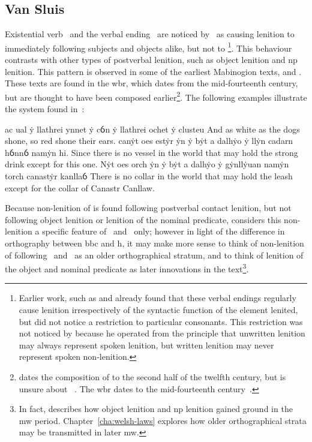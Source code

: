 \subsection{Van Sluis}
\label{sec:van-sluis}
Existential verb \oes\ and the verbal ending \ei\ are noticed by~\textcite{van_development14} as causing lenition to immediately following subjects and objects alike, but not to \footnote{Earlier work, such as \textcite[§~21]{evans_grammar_1964} and \textcite[§~70]{morgan_y_1952} already found that these verbal endings regularly cause lenition irrespectively of the syntactic function of the element lenited, but did not notice a restriction to particular consonants. This restriction was not noticed by \textcite[§~71]{morgan_y_1952} because he operated from the principle that unwritten lenition may always represent spoken lenition, but written lenition may never represent spoken non-lenition.}. This behaviour contrasts with other types of postverbal lenition, such as object lenition and \gls{np} lenition. This pattern is observed in some of the earliest Mabinogion texts, \ie {} and . These texts are found in the \gls{wbr}, which dates from the mid-fourteenth century, but are thought to have been composed earlier\footnote{\Textcite[43]{rodway_date_2005} dates the composition of  to the second half of the twelfth century, but is unsure about ~\autocite[59]{Rod_Where07}. The \gls{wbr} dates to the mid-fourteenth century~\autocite[59]{huws_medieval_2000}.}. The following examples  illustrate the system found in~\textcite{van_development14}:
\begin{mwl}
  {ac ual ẏ llathrei ynnet ẏ cỽn ẏ llathrei ochet ẏ clusteu}%
  {And as white as the dogs shone, so red shone their ears.}%
  {canẏt oes estẏr ẏn ẏ bẏt a dalhẏo ẏ llẏn cadarn hỽnnỽ namẏn hi.}%
  {Since there is no vessel in the world that may hold the strong drink except for this one.}%
  {Nẏt oes orch ẏn ẏ bẏt a dalhẏo ẏ gẏnllẏuan namẏn torch canastẏr kanllaỽ}%
  {There is no collar in the world that may hold the leash except for the collar of Canastr Canllaw.}%
\end{mwl}
Because non-lenition of  is found following postverbal contact lenition, but not following object lenition or lenition of the nominal predicate, \textcite{van_development14} considers this non-lenition a specific feature of \ei\ and \oes\ only; however in light of the difference in orthography between \gls{bbc} and \gls{h}, it may make more sense to think of non-lenition of  following \ei\ and \oes\ as an older orthographical stratum, and to think of lenition of the object and nominal predicate as later innovations in the text\footnote{In fact, \textcite{van_development14} describes how object lenition and \gls{np} lenition gained ground in the \gls{mw} period. Chapter~\ref{cha:welsh-laws} explores how older orthographical strata may be transmitted in later \gls{mw}.}.

